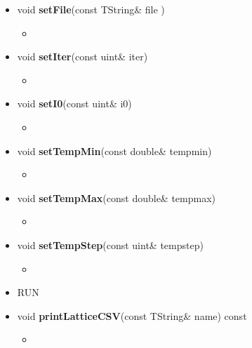 \documentclass[11pt,a4paper]{article}
\begin{document}
\begin{itemize}
\begin{itemize}
			
			\item[] void \textbf{setFile}(const TString\& \textunderscore file ) 	 
			\begin{itemize}
				\item[] 
			\end{itemize}
			
			\item[]	void \textbf{setIter}(const uint\& \textunderscore iter) 	 
			\begin{itemize}
				\item[] 
			\end{itemize}
			
			\item[] void \textbf{setI0}(const uint\& \textunderscore i0) 	 
			\begin{itemize}
				\item[] 
			\end{itemize}
			
			\item[] void \textbf{setTempMin}(const double\& \textunderscore tempmin) 		 
			\begin{itemize}
				\item[] 
			\end{itemize}	
			
			\item[] void \textbf{setTempMax}(const double\& \textunderscore tempmax)			 
			\begin{itemize}
				\item[] 
			\end{itemize}
			
			\item[] void \textbf{setTempStep}(const uint\& \textunderscore tempstep) 			 
			\begin{itemize}
				\item[] 
			\end{itemize}
			
			

			
		\item[] RUN \\
			
			\item[] void \textbf{printLatticeCSV}(const TString\& name) const		 
			\begin{itemize}
				\item[] 
			\end{itemize}
			
	\end{itemize}

	
\end{itemize}
\end{document}
